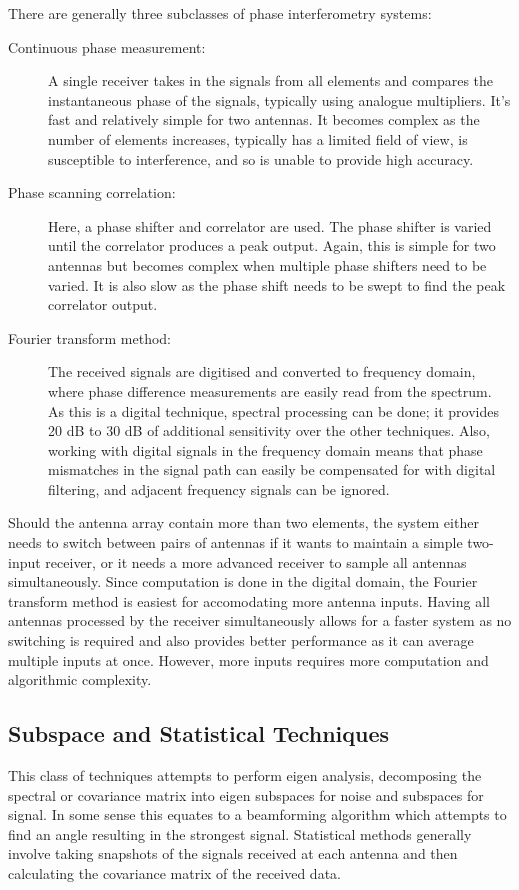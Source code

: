 There are generally three subclasses of phase interferometry systems\cite{jenkins1991smallaperture}:
\begin{description}
  \item [Continuous phase measurement:] A single receiver takes in the signals from all elements and compares the instantaneous phase of the signals, typically using analogue multipliers. It's fast and relatively simple for two antennas. It becomes complex as the number of elements increases, typically has a limited field of view, is susceptible to interference, and so is unable to provide high accuracy.
  \item [Phase scanning correlation:] Here, a phase shifter and correlator are used. The phase shifter is varied until the correlator produces a peak output. Again, this is simple for two antennas but becomes complex when multiple phase shifters need to be varied. It is also slow as the phase shift needs to be swept to find the peak correlator output.
  \item [Fourier transform method:] The received signals are digitised and converted to frequency domain, where phase difference measurements are easily read from the spectrum. As this is a digital technique, spectral processing can be done; it provides 20 dB to 30 dB of additional sensitivity over the other techniques. Also, working with digital signals in the frequency domain means that phase mismatches in the signal path can easily be compensated for with digital filtering, and adjacent frequency signals can be ignored.
\end{description}
Should the antenna array contain more than two elements, the system either needs to switch between pairs of antennas if it wants to maintain a simple two-input receiver, or it needs a more advanced receiver to sample all antennas simultaneously. Since computation is done in the digital domain, the Fourier transform method is easiest for accomodating more antenna inputs. Having all antennas processed by the receiver simultaneously allows for a faster system as no switching is required and also provides better performance as it can average multiple inputs at once. However, more inputs requires more computation and algorithmic complexity.

\subsection{Subspace and Statistical Techniques}
This class of techniques attempts to perform eigen analysis, decomposing the spectral or covariance matrix into eigen subspaces for noise and subspaces for signal. In some sense this equates to a beamforming algorithm which attempts to find an angle resulting in the strongest signal. 
Statistical methods generally involve taking snapshots of the signals received at each antenna and then calculating the covariance matrix of the received data\cite{poisel2012electronic}.

